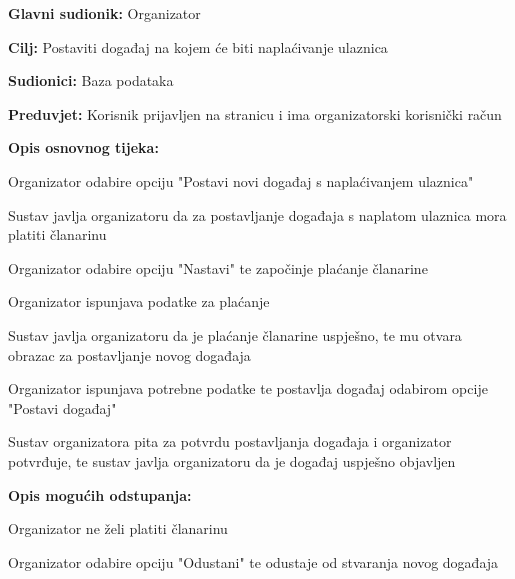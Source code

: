 					\noindent {}
\begin{packed_item}
	\item \textbf{Glavni sudionik:} Organizator
	\item  \textbf{Cilj:} Postaviti događaj na kojem će biti naplaćivanje ulaznica
	\item  \textbf{Sudionici:} Baza podataka
	\item  \textbf{Preduvjet:} Korisnik prijavljen na stranicu i ima organizatorski korisnički račun
	\item  \textbf{Opis osnovnog tijeka:}
	
	\item[] \begin{packed_enum}
		
		\item Organizator odabire opciju "Postavi novi događaj s naplaćivanjem ulaznica"
		\item Sustav javlja organizatoru da za postavljanje događaja s naplatom ulaznica mora platiti članarinu
		\item Organizator odabire opciju "Nastavi" te započinje plaćanje članarine
		\item Organizator ispunjava podatke za plaćanje
		\item Sustav javlja organizatoru da je plaćanje članarine uspješno, te mu otvara obrazac za postavljanje novog događaja
		\item Organizator ispunjava potrebne podatke te postavlja događaj odabirom opcije "Postavi događaj"
		\item Sustav organizatora pita za potvrdu postavljanja događaja i organizator potvrđuje, te sustav javlja organizatoru da je događaj uspješno objavljen
	\end{packed_enum}
	
	\item  \textbf{Opis mogućih odstupanja:}
	
	\item[] \begin{packed_item}
		
		\item[3.a] Organizator ne želi platiti članarinu
		\item[] \begin{packed_enum}
			
			\item Organizator odabire opciju "Odustani" te odustaje od stvaranja novog događaja
			

\end{packed_enum}
\end{packed_item}
\end{packed_item}
